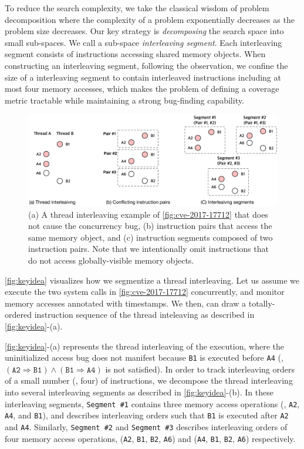 %
To reduce the search complexity, we take the classical wisdom of
problem decomposition where the complexity of a problem exponentially
decreases as the problem size decreases.
%
Our key strategy is \textit{decomposing} the search space into small
sub-spaces. We call a sub-space \textit{interleaving segment}.
%
Each interleaving segment consists of instructions accessing 
shared memory objects.
%
%
When constructing an interleaving segment, following the observation, 
we confine the size of a interleaving segment 
to contain interleaved instructions including at most four memory accesses,
which makes the problem of defining a coverage metric tractable while maintaining a strong bug-finding capability.


%
\begin{figure}[t]
  \centering
  \includegraphics[width=0.9\linewidth]{fig/intuition.pdf}
  \caption{(a) A thread interleaving example of
    \autoref{fig:cve-2017-17712} that does not cause the concurrency
    bug, (b) instruction pairs that access the same memory object, and
    (c) instruction segments composed of two instruction pairs.  Note
    that we intentionally omit instructions that do not access
    globally-visible memory objects.}
  \label{fig:keyidea}
\end{figure}
%
\autoref{fig:keyidea} visualizes how we segmentize a thread
interleaving.
%
Let us assume we execute the two system calls in
\autoref{fig:cve-2017-17712} concurrently, and monitor memory accesses
annotated with timestamps.
%
We then, can draw a totally-ordered instruction sequence of the thread
inteleaving as described in \autoref{fig:keyidea}-(a).


%
\autoref{fig:keyidea}-(a) represents the thread interleaving of the
execution, where the uninitialized access bug does not manifest
because \texttt{B1} is executed before \texttt{A4} (\ie,
$(\texttt{A2} \Rightarrow \texttt{B1}) \wedge (\texttt{B1} \Rightarrow
\texttt{A4})$ is not satisfied).
%
In order to track interleaving orders of a small number (\eg, four) of
instructions, we decompose the thread interleaving into several
interleaving segments as described in \autoref{fig:keyidea}-(b).
%
In these interleaving segments, \texttt{Segment \#1} contains three
memory access operations (\ie, \texttt{A2}, \texttt{A4}, and
\texttt{B1}), and describes interleaving orders such that \texttt{B1}
is executed after \texttt{A2} and \texttt{A4}.
%
Similarly, \texttt{Segment \#2} and \texttt{Segment \#3} describes
interleaving orders of four memory access operations, (\texttt{A2},
\texttt{B1}, \texttt{B2}, \texttt{A6}) and (\texttt{A4}, \texttt{B1},
\texttt{B2}, \texttt{A6}) respectively.
%

